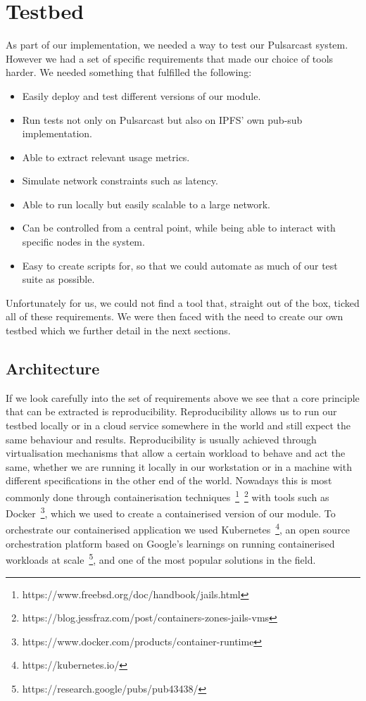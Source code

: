 \section{Testbed}\label{testbed}

As part of our implementation, we needed a way to test our Pulsarcast system.
However we had a set of specific requirements that made our choice of tools
harder. We needed something that fulfilled the following:

\begin{itemize}
  \item Easily deploy and test different versions of our module.
  \item Run tests not only on Pulsarcast but also on IPFS' own pub-sub
    implementation.
  \item Able to extract relevant usage metrics.
  \item Simulate network constraints such as latency.
  \item Able to run locally but easily scalable to a large network.
  \item Can be controlled from a central point, while being able to interact
    with specific nodes in the system.
  \item Easy to create scripts for, so that we could automate as much of our
    test suite as possible.
\end{itemize}

Unfortunately for us, we could not find a tool that, straight out of the box,
ticked all of these requirements. We were then faced with the need to create
our own testbed which we further detail in the next sections.

\subsection{Architecture}\label{testbed-architecture}

If we look carefully into the set of
requirements above we see that a core principle that can be extracted is
reproducibility. Reproducibility allows us to run our testbed locally or in a
cloud service somewhere in the world and still expect the same behaviour and
results. Reproducibility is usually achieved through virtualisation mechanisms
that allow a certain workload to behave and act the same, whether we are
running it locally in our workstation or in a machine with different
specifications in the other end of the world. Nowadays this is most commonly
done through containerisation
techniques~\footnote{https://www.freebsd.org/doc/handbook/jails.html}~\footnote{https://blog.jessfraz.com/post/containers-zones-jails-vms}
with tools such as
Docker~\footnote{https://www.docker.com/products/container-runtime}, which we
used to create a containerised version of our module. To orchestrate our
containerised application we used Kubernetes~\footnote{https://kubernetes.io/},
an open source orchestration platform based on Google's learnings on running
containerised workloads at
scale~\footnote{https://research.google/pubs/pub43438/}, and one of the most
popular solutions in the field.

